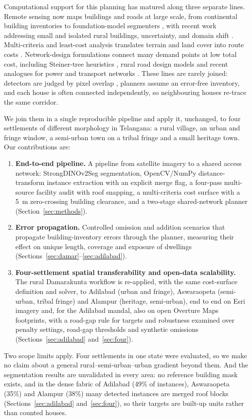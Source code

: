 \documentclass[12pt,a4paper]{article}
\begin{document}
Computational support for this planning has matured along three separate lines. Remote sensing now maps buildings and roads at large scale, from continental building inventories \cite{sirko2021openbuildings} to foundation-model segmenters \cite{oquab2023dinov2}, with recent work addressing small and isolated rural buildings, uncertainty, and domain shift \cite{r62,r63,r64,r65,r66,r67,r68,r69,r70}. Multi-criteria and least-cost analysis translates terrain and land cover into route costs \cite{r06,r53,r54,collischonn2000lcp}. Network-design formulations connect many demand points at low total cost, including Steiner-tree heuristics \cite{kou1981steiner,mehlhorn1988steiner,hwang1992steiner,r51}, rural road design models \cite{r41,r43,r44} and recent analogues for power and transport networks \cite{r45,r46,r47,r50}. These lines are rarely joined: detectors are judged by pixel overlap \cite{r01}, planners assume an error-free inventory, and each house is often connected independently, so neighbouring houses re-trace the same corridor.

We join them in a single reproducible pipeline and apply it, unchanged, to four settlements of different morphology in Telangana: a rural village, an urban and fringe window, a semi-urban town on a tribal fringe and a small heritage town. Our contributions are:
\begin{enumerate}
\item \textbf{End-to-end pipeline.} A pipeline from satellite imagery to a shared access network: StrongDINOv2Seg segmentation, OpenCV/NumPy distance-transform instance extraction with an explicit merge flag, a four-pass multi-source facility audit with roof snapping, a multi-criteria cost surface with a 5~m zero-crossing building clearance, and a two-stage shared-network planner (Section~\ref{sec:methods}).
\item \textbf{Error propagation.} Controlled omission and addition scenarios that propagate building-inventory errors through the planner, measuring their effect on unique length, coverage and exposure of dwellings (Sections~\ref{sec:damar}--\ref{sec:adilabad}).
\item \textbf{Four-settlement spatial transferability and open-data scalability.} The rural Damarakunta workflow is re-applied, with the same cost-surface definition and solver, to Adilabad (urban and fringe), Aswaraopeta (semi-urban, tribal fringe) and Alampur (heritage, semi-urban), end to end on Esri imagery and, for the Adilabad mandal, also on open Overture Maps footprints, with a road-gap rule for targets and robustness examined over penalty settings, road-gap thresholds and synthetic omissions (Sections~\ref{sec:adilabad} and~\ref{sec:four}).
\end{enumerate}
Two scope limits apply. Four settlements in one state were evaluated, so we make no claim about a general rural--semi-urban--urban gradient beyond them. And the segmentation results are unvalidated in every area: no reference building mask exists, and in the dense fabric of Adilabad (49\% of instances), Aswaraopeta (35\%) and Alampur (38\%) many detected instances are merged roof blocks (Sections~\ref{sec:adilabad} and~\ref{sec:four}), so their targets are built-up units rather than counted houses.
\end{document}
